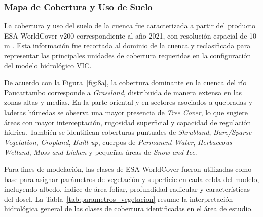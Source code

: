 \subsubsection{Mapa de Cobertura y Uso de Suelo}

La cobertura y uso del suelo de la cuenca fue caracterizada a partir del
producto ESA WorldCover v200 correspondiente al año 2021, con resolución
espacial de 10 m \parencite{zanaga2022worldcover}. Esta información fue
recortada al dominio de la cuenca y reclasificada para representar las
principales unidades de cobertura requeridas en la configuración del modelo
hidrológico VIC.

De acuerdo con la Figura~\ref{fig:8a}, la cobertura dominante en la cuenca del
río Paucartambo corresponde a \textit{Grassland}, distribuida de manera extensa
en las zonas altas y medias. En la parte oriental y en sectores asociados a
quebradas y laderas húmedas se observa una mayor presencia de \textit{Tree
Cover}, lo que sugiere áreas con mayor interceptación, rugosidad superficial y
capacidad de regulación hídrica. También se identifican coberturas puntuales de
\textit{Shrubland}, \textit{Bare/Sparse Vegetation}, \textit{Cropland},
\textit{Built-up}, cuerpos de \textit{Permanent Water}, \textit{Herbaceous
Wetland}, \textit{Moss and Lichen} y pequeñas áreas de \textit{Snow and Ice}.

Para fines de modelación, las clases de ESA WorldCover fueron utilizadas como
base para asignar parámetros de vegetación y superficie en cada celda del
modelo, incluyendo albedo, índice de área foliar, profundidad radicular y
características del dosel. La Tabla~\ref{tab:parametros_vegetacion} resume la
interpretación hidrológica general de las clases de cobertura identificadas en
el área de estudio.

